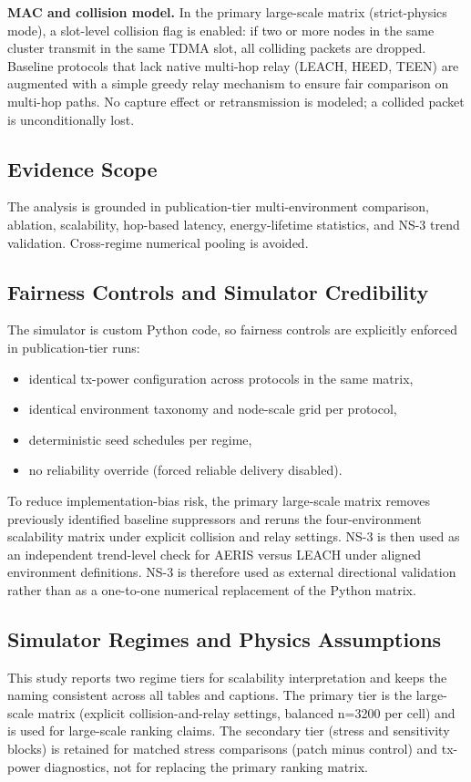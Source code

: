 ﻿\documentclass[sensors,article,submit,moreauthors,pdftex]{Definitions/mdpi}
\begin{document}
\noindent\textbf{MAC and collision model.}
In the primary large-scale matrix (strict-physics mode), a slot-level collision flag is enabled: if two or more nodes in the same cluster transmit in the same TDMA slot, all colliding packets are dropped.
Baseline protocols that lack native multi-hop relay (LEACH, HEED, TEEN) are augmented with a simple greedy relay mechanism to ensure fair comparison on multi-hop paths.
No capture effect or retransmission is modeled; a collided packet is unconditionally lost.

\subsection{Evidence Scope}
The analysis is grounded in publication-tier multi-environment comparison, ablation, scalability, hop-based latency, energy-lifetime statistics, and NS-3 trend validation. Cross-regime numerical pooling is avoided.

\subsection{Fairness Controls and Simulator Credibility}
The simulator is custom Python code, so fairness controls are explicitly enforced in publication-tier runs:
\begin{itemize}
\item identical tx-power configuration across protocols in the same matrix,
\item identical environment taxonomy and node-scale grid per protocol,
\item deterministic seed schedules per regime,
\item no reliability override (forced reliable delivery disabled).
\end{itemize}

To reduce implementation-bias risk, the primary large-scale matrix removes previously identified baseline suppressors and reruns the four-environment scalability matrix under explicit collision and relay settings. NS-3 is then used as an independent trend-level check for AERIS versus LEACH under aligned environment definitions. NS-3 is therefore used as external directional validation rather than as a one-to-one numerical replacement of the Python matrix.

\subsection{Simulator Regimes and Physics Assumptions}
This study reports two regime tiers for scalability interpretation and keeps the naming consistent across all tables and captions. The primary tier is the large-scale matrix (explicit collision-and-relay settings, balanced n=3200 per cell) and is used for large-scale ranking claims. The secondary tier (stress and sensitivity blocks) is retained for matched stress comparisons (patch minus control) and tx-power diagnostics, not for replacing the primary ranking matrix.
\end{document}
